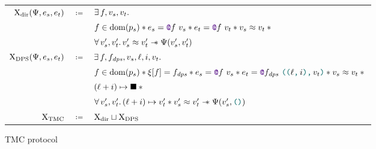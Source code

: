 \begin{figure}[tp]
    \begin{tabular}{rcl}
            $\iProt_\mathrm{dir} (\iPredTwo, \datalangExpr_s, \datalangExpr_t)$
            & $\coloneqq$ &
            $\exists \datalangFn, \datalangVal_s, \datalangVal_t \ldotp$
        \\
            &&
            $\datalangFn \in \dom{\datalangProg_s} \iSep
            \datalangExpr_s = \datalangCall{\datalangFnptr{\datalangFn}}{\datalangVal_s} \iSep
            \datalangExpr_t = \datalangCall{\datalangFnptr{\datalangFn}}{\datalangVal_t} \iSep
            \datalangVal_s \iSimilar \datalangVal_t \iSep {}$
        \\
            &&
            $\forall \datalangVal_s', \datalangVal_t' \ldotp
            \datalangVal_s' \iSimilar \datalangVal_t' \iSepImp
            \iPredTwo (\datalangVal_s', \datalangVal_t')$
        \\
            $\iProt_\mathrm{DPS} (\iPredTwo, \datalangExpr_s, \datalangExpr_t)$
            & $\coloneqq$ &
            $\exists \datalangFn, \datalangFn_\mathit{dps}, \datalangVal_s, \datalangLoc, \datalangIdx, \datalangVal_t \ldotp$
        \\
            &&
            $\datalangFn \in \dom{\datalangProg_s} \iSep
            \datalangRenaming [\datalangFn] = \datalangFn_\mathit{dps} \iSep
            \datalangExpr_s = \datalangCall{\datalangFnptr{\datalangFn}}{\datalangVal_s} \iSep
            \datalangExpr_t = \datalangCall{\datalangFnptr{\datalangFn_\mathit{dps}}}{\datalangPair{\datalangPair{\datalangLoc}{\datalangIdx}}{\datalangVal_t}} \iSep
            \datalangVal_s \iSimilar \datalangVal_t \iSep {}$
        \\
            &&
            $(\datalangLoc + \datalangIdx) \iPointsto \datalangHole \iSep {}$
        \\
            &&
            $\forall \datalangVal_s', \datalangVal_t' \ldotp
            (\datalangLoc + \datalangIdx) \iPointsto \datalangVal_t' \iSep
            \datalangVal_s' \iSimilar \datalangVal_t' \iSepImp
            \iPredTwo (\datalangVal_s', \datalangUnit)$
        \\
            $\mathrm{X}_\mathrm{TMC}$
            & $\coloneqq$ &
            $\mathrm{X}_\mathrm{dir} \sqcup \mathrm{X}_\mathrm{DPS}$
    \end{tabular}
    \caption{TMC protocol}
    \label{fig:protocol}
\end{figure}